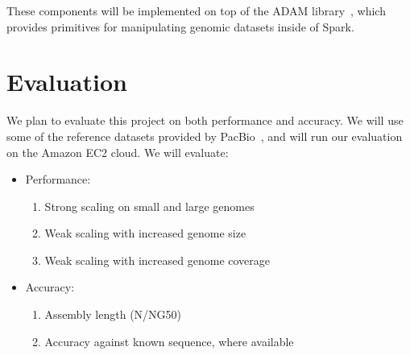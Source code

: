 \documentclass[11pt]{article}
\begin{document}
These components will be implemented on top of the ADAM library~\cite{nothaft15}, which provides primitives for
manipulating genomic datasets inside of Spark.

\section{Evaluation}

We plan to evaluate this project on both performance and accuracy. We will use some of the reference
datasets provided by PacBio~\cite{pb-datasets}, and will run our evaluation on the Amazon EC2 cloud.
We will evaluate:

\begin{itemize}
\item Performance:
\begin{enumerate}
\item Strong scaling on small and large genomes
\item Weak scaling with increased genome size
\item Weak scaling with increased genome coverage
\end{enumerate}
\item Accuracy:
\begin{enumerate}
\item Assembly length (N/NG50)
\item Accuracy against known sequence, where available
\end{enumerate}
\end{itemize}



\end{document}
